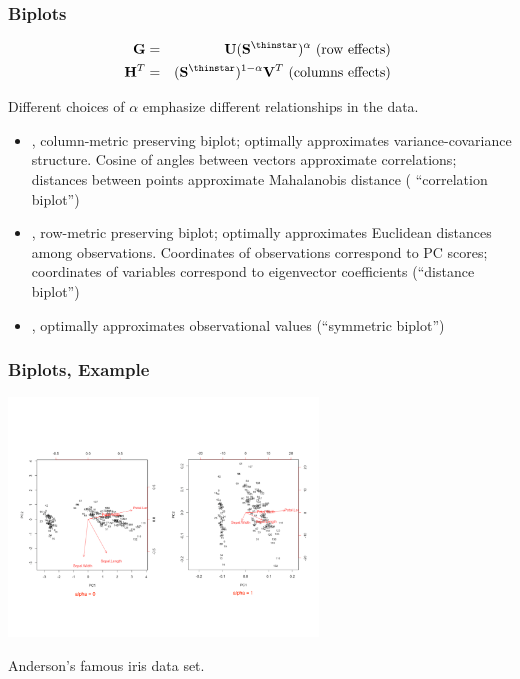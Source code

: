 \documentclass{beamer}
\begin{document}
\begin{frame}
  \frametitle{Biplots}

\begin{eqnarray*}
\Mtx{G} &=& \Mtx{U}(\Mtx{S}^{\thinstar})^{\alpha} \text{ (row effects) } \\
\Mtx{H}^T &=& (\Mtx{S}^{\thinstar})^{1-\alpha} \Mtx{V}^T \text{ (columns effects) }
\end{eqnarray*}

Different choices of $\alpha$ emphasize different relationships in the data.

\begin{itemize}
\item {}, column-metric preserving biplot; optimally approximates variance-covariance structure. Cosine of angles between vectors approximate correlations; distances between points approximate Mahalanobis distance ( ``correlation biplot'')
\item {}, row-metric preserving biplot; optimally approximates Euclidean distances among observations. Coordinates of observations correspond to PC scores; coordinates of variables correspond to eigenvector coefficients (``distance biplot'')
\item {},  optimally approximates observational values (``symmetric biplot'')
\end{itemize}

\end{frame}


\begin{frame}
  \frametitle{Biplots, Example}


\begin{center}
\includegraphics[height=2.5in]{iris-biplots2}

{\footnotesize Anderson's famous iris data set.}
\end{center}


\end{frame}
\end{document}
